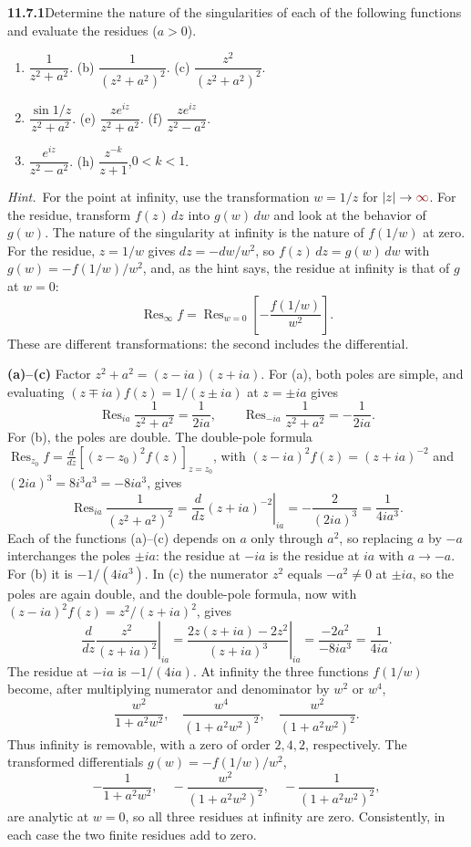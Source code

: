 \par\bigskip
\noindent\textbf{11.7.1}\quad Determine the nature of the singularities of
each of the following functions and evaluate the residues ($a>0$).
\begin{enumerate}
\item[(a)] $\dfrac{1}{z^{2}+a^{2}}$.\qquad
(b) $\dfrac{1}{(z^{2}+a^{2})^{2}}$.\qquad
(c) $\dfrac{z^{2}}{(z^{2}+a^{2})^{2}}$.
\item[(d)] $\dfrac{\sin 1/z}{z^{2}+a^{2}}$.\qquad
(e) $\dfrac{ze^{iz}}{z^{2}+a^{2}}$.\qquad
(f) $\dfrac{ze^{iz}}{z^{2}-a^{2}}$.
\item[(g)] $\dfrac{e^{iz}}{z^{2}-a^{2}}$.\qquad
(h) $\dfrac{z^{-k}}{z+1}$,\quad $0 < k < 1$.
\end{enumerate}
\emph{Hint.}~For the point at infinity, use the transformation $w=1/z$ for
$|z|\to\erratum{\infty}$. For the residue, transform $f(z)\,dz$ into $g(w)\,dw$ and look at
the behavior of $g(w)$.
\solution
{} The nature of the
singularity at infinity is the nature of $f(1/w)$ at zero. For the
residue, $z=1/w$ gives $dz=-dw/w^2$, so $f(z)\,dz=g(w)\,dw$ with
$g(w)=-f(1/w)/w^2$, and, as the hint says, the residue at infinity is
that of $g$ at $w=0$:
\[
\operatorname{Res}_{\infty}f
=\operatorname{Res}_{w=0}\left[-\frac{f(1/w)}{w^2}\right].
\]
These are different transformations: the second includes the differential.

\textbf{(a)--(c)} Factor $z^2+a^2=(z-ia)(z+ia)$. For (a), both poles
are simple, and evaluating $(z\mp ia)f(z)=1/(z\pm ia)$ at $z=\pm ia$ gives
\[
\operatorname{Res}_{ia}\frac1{z^2+a^2}=\frac1{2ia},\qquad
\operatorname{Res}_{-ia}\frac1{z^2+a^2}=-\frac1{2ia}.
\]
For (b), the poles are double. The double-pole formula
$\operatorname{Res}_{z_0}f=\frac{d}{dz}[(z-z_0)^2f(z)]_{z=z_0}$, with
$(z-ia)^2f(z)=(z+ia)^{-2}$ and $(2ia)^3=8i^3a^3=-8ia^3$, gives
\[
\operatorname{Res}_{ia}\frac1{(z^2+a^2)^2}
=\left.\frac{d}{dz}(z+ia)^{-2}\right|_{ia}
=-\frac2{(2ia)^3}=\frac1{4ia^3}.
\]
Each of the functions (a)--(c) depends on $a$ only through $a^2$, so
replacing $a$ by $-a$ interchanges the poles $\pm ia$: the residue at
$-ia$ is the residue at $ia$ with $a\to-a$. For (b) it is
$-1/(4ia^3)$. In (c) the numerator $z^2$ equals $-a^2\ne0$ at $\pm ia$,
so the poles are again double, and the double-pole formula, now with
$(z-ia)^2f(z)=z^2/(z+ia)^2$, gives
\[
\left.\frac{d}{dz}\frac{z^2}{(z+ia)^2}\right|_{ia}
=\left.\frac{2z(z+ia)-2z^2}{(z+ia)^3}\right|_{ia}
=\frac{-2a^2}{-8ia^3}=\frac1{4ia}.
\]
The residue at $-ia$ is $-1/(4ia)$. At infinity the three functions
$f(1/w)$ become, after multiplying numerator and denominator by $w^2$
or $w^4$,
\[
\frac{w^2}{1+a^2w^2},\quad
\frac{w^4}{(1+a^2w^2)^2},\quad
\frac{w^2}{(1+a^2w^2)^2}.
\]
Thus infinity is removable, with a zero of order $2,4,2$, respectively.
The transformed differentials $g(w)=-f(1/w)/w^2$,
\[
-\frac1{1+a^2w^2},\quad
-\frac{w^2}{(1+a^2w^2)^2},\quad
-\frac1{(1+a^2w^2)^2},
\]
are analytic at $w=0$, so all three residues at infinity are zero.
Consistently, in each case the two finite residues add to zero.

